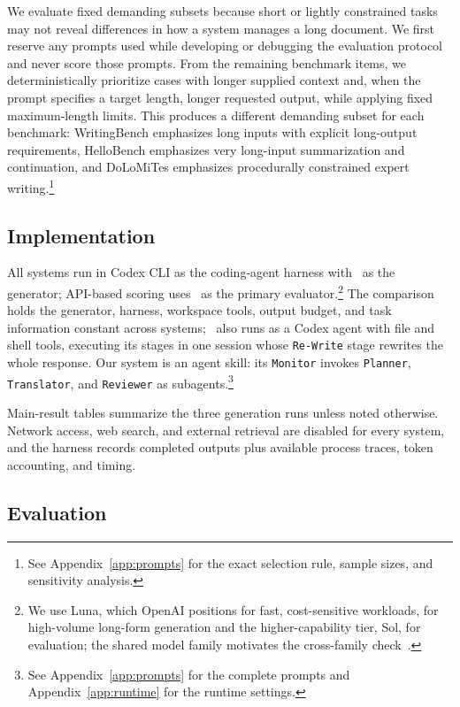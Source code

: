 We evaluate fixed demanding subsets because short or lightly constrained tasks may not reveal differences in how a system manages a long document.
We first reserve any prompts used while developing or debugging the evaluation protocol and never score those prompts.
From the remaining benchmark items, we deterministically prioritize cases with longer supplied context and, when the prompt specifies a target length, longer requested output, while applying fixed maximum-length limits.
This produces a different demanding subset for each benchmark: WritingBench emphasizes long inputs with explicit long-output requirements, HelloBench emphasizes very long-input summarization and continuation, and DoLoMiTes emphasizes procedurally constrained expert writing.\footnote{See Appendix~\ref{app:prompts} for the exact selection rule, sample sizes, and sensitivity analysis.}

\subsection{Implementation}
\label{sec:implementation}

All systems run in Codex CLI as the coding-agent harness with \modelGenBare\ as the generator; API-based scoring uses \modelJudgeBare\ as the primary evaluator.\footnote{We use Luna, which OpenAI positions for fast, cost-sensitive workloads, for high-volume long-form generation and the higher-capability tier, Sol, for evaluation; the shared model family motivates the cross-family check~\citep{openai2026gpt56,openai2026luna,openai2026sol}.}
The comparison holds the generator, harness, workspace tools, output budget, and task information constant across systems; \condStaged\ also runs as a Codex agent with file and shell tools, executing its stages in one session whose \texttt{Re-Write} stage rewrites the whole response.
Our system is an agent skill: its \texttt{Monitor} invokes \texttt{Planner}, \texttt{Translator}, and \texttt{Reviewer} as subagents.\footnote{See Appendix~\ref{app:prompts} for the complete prompts and Appendix~\ref{app:runtime} for the runtime settings.}

Main-result tables summarize the three generation runs unless noted otherwise.
Network access, web search, and external retrieval are disabled for every system, and the harness records completed outputs plus available process traces, token accounting, and timing.

\subsection{Evaluation}
\label{sec:evaluation}

